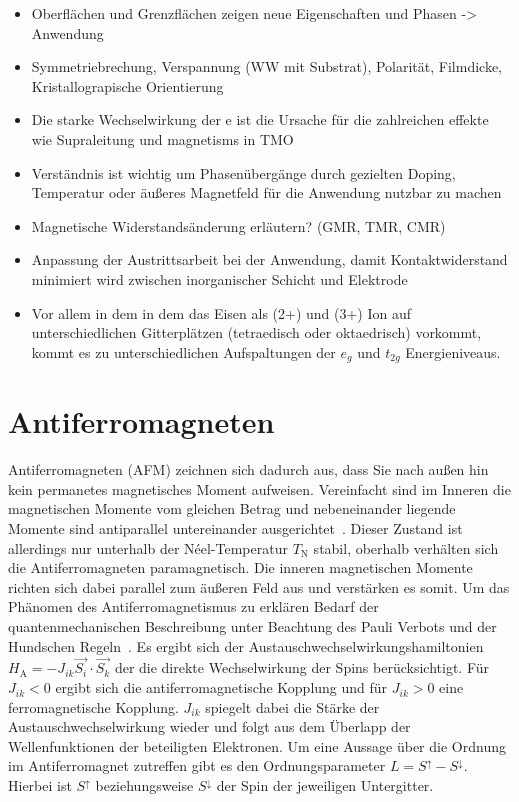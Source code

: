         \begin{itemize}
            \item Oberflächen und Grenzflächen zeigen neue Eigenschaften und Phasen -> Anwendung 
            \item Symmetriebrechung, Verspannung (WW mit Substrat), Polarität, Filmdicke, Kristallograpische Orientierung
            \item Die starke Wechselwirkung der e ist die Ursache für die zahlreichen effekte wie Supraleitung und magnetisms in TMO 
            \item Verständnis ist wichtig um Phasenübergänge durch gezielten Doping, Temperatur oder äußeres Magnetfeld für die Anwendung nutzbar zu machen
            \item Magnetische Widerstandsänderung erläutern? (GMR, TMR, CMR)
            \item Anpassung der Austrittsarbeit bei der Anwendung, damit Kontaktwiderstand minimiert wird zwischen inorganischer Schicht und Elektrode \cite{IF_11, NiO_40}
            \item Vor allem in dem  in dem das Eisen als (2+) und (3+) Ion auf unterschiedlichen Gitterplätzen (tetraedisch oder oktaedrisch) vorkommt, kommt es zu unterschiedlichen Aufspaltungen der $e_g$ und $t_{2g}$ Energieniveaus.
        \end{itemize}

    
    \section{Antiferromagneten} \label{sec:AFM}
        Antiferromagneten (AFM) zeichnen sich dadurch aus, dass Sie nach außen hin kein permanetes magnetisches Moment aufweisen.
        Vereinfacht sind im Inneren die magnetischen Momente vom gleichen Betrag und nebeneinander liegende Momente sind antiparallel untereinander ausgerichtet~\cite{Suter}.
        Dieser Zustand ist allerdings nur unterhalb der Néel-Temperatur $T_\text{N}$ stabil, oberhalb verhälten sich die Antiferromagneten paramagnetisch.
        Die inneren magnetischen Momente richten sich dabei parallel zum äußeren Feld aus und verstärken es somit.
        Um das Phänomen des Antiferromagnetismus zu erklären Bedarf der quantenmechanischen Beschreibung unter Beachtung des Pauli Verbots und der Hundschen Regeln~\cite{TUChemnitz}.
        Es ergibt sich der Austauschwechselwirkungshamiltonien $H_\text{A} = - J_{ik} \vec{S_i}\cdot\vec{S_k}$ der die direkte Wechselwirkung der Spins berücksichtigt.
        Für $J_{ik} < 0$ ergibt sich die antiferromagnetische Kopplung und für $J_{ik} > 0$ eine ferromagnetische Kopplung.
        $J_{ik}$ spiegelt dabei die Stärke der Austauschwechselwirkung wieder und folgt aus dem Überlapp der Wellenfunktionen der beteiligten Elektronen.
        Um eine Aussage über die Ordnung im Antiferromagnet zutreffen gibt es den Ordnungsparameter $L = S^{\uparrow} - S^{\downarrow}$.
        Hierbei ist $S^{\uparrow}$ beziehungsweise $S^{\downarrow}$ der Spin der jeweiligen Untergitter.

